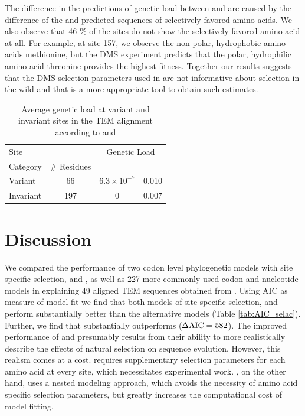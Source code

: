 \documentclass[fleqn,letterpaper]{article}
\begin{document}
The difference in the predictions of genetic load between \selac and \phydms are caused by the difference of the \selac and \phydms predicted sequences of selectively favored amino acids.
We also observe that 46 \% of the sites do not show the selectively favored amino acid at all.
For example, at site 157, we observe the non-polar, hydrophobic amino acids methionine, but the DMS experiment predicts that the polar, hydrophilic amino acid threonine provides the highest fitness.
Together our results suggests that the DMS selection parameters used in \phydms are not informative about selection in the wild and that \selac is a more appropriate tool to obtain such estimates.

\begin{table}
  \centering
  \caption{Average genetic load at variant and invariant sites in the TEM alignment according to \selac and \phydms}
  \begin{tabular}{lccc}
    \hline
	Site		& 		& \multicolumn{2}{c}{Genetic Load}  \\ 
    Category 		& \# Residues	& \multicolumn{1}{c}{\selac} & \multicolumn{1}{c}{\phydms} \\ \hline 
    Variant	&	66	& $6.3\times10^{-7}$ & 0.010  \\
    Invariant		& 	197	& 0 & 0.007 \\ \hline
  \end{tabular}
  \label{tab:selection}
\end{table}


\section{Discussion}
We compared the performance of two codon level phylogenetic models with site specific selection, \phydms and \selac, as well as 227 more commonly used codon and nucleotide models in explaining 49 aligned TEM sequences obtained from \citet{bloom2017}.
Using AIC as measure of model fit we find that both models of site specific selection, \phydms and \selac perform substantially better than the alternative models (Table \ref{tab:AIC_selac}).
Further, we find that \selac substantially outperforms \phydms ($\Delta\text{AIC} = 582$).
The improved performance of \phydms and \selac presumably results from their ability to more realistically describe the effects of natural selection on sequence evolution.
However, this realism comes at a cost. 
\phydms requires supplementary selection parameters for each amino acid at every site, which necessitates experimental work.
\selac, on the other hand, uses a nested modeling approach, which avoids the necessity of amino acid specific selection parameters, but greatly increases the computational cost of model fitting.
\end{document}
